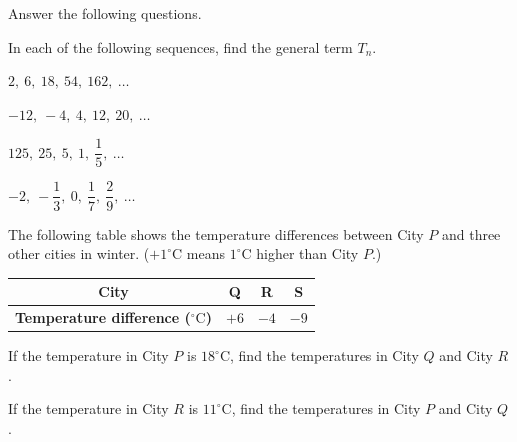  Answer the following questions.

\begin{subparts}
  \item In each of the following sequences, find the general term $T_n$.
  \begin{subpartsii}
    \item $2,\ 6,\ 18,\ 54,\ 162,\ \ldots$
    \item $-12,\ -4,\ 4,\ 12,\ 20,\ \ldots$
    \item $125,\ 25,\ 5,\ 1,\ \dfrac{1}{5},\ \ldots$
    \item $-2,\ -\dfrac{1}{3},\ 0,\ \dfrac{1}{7},\ \dfrac{2}{9},\ \ldots$
  \end{subpartsii}

  \item The following table shows the temperature differences between City $P$ and three other cities in winter. ($+1^\circ\text{C}$ means $1^\circ\text{C}$ higher than City $P$.)

  \vspace{1em}
  
  \par\noindent\hfill
  \begin{tabular}{|c|c|c|c|}
  \hline
  \textbf{City} & Q & R & S \\
  \hline
  \textbf{Temperature difference ($^\circ\text{C}$)} & $+6$ & $-4$ & $-9$ \\
  \hline
  \end{tabular}
  \hfill\mbox{}\par

  \vspace{1em}

  \begin{subpartsii}
    \item If the temperature in City $P$ is $18^\circ\text{C}$, find the temperatures in City $Q$ and City $R$.
    \item If the temperature in City $R$ is $11^\circ\text{C}$, find the temperatures in City $P$ and City $Q$.
  \end{subpartsii}
\end{subparts}


